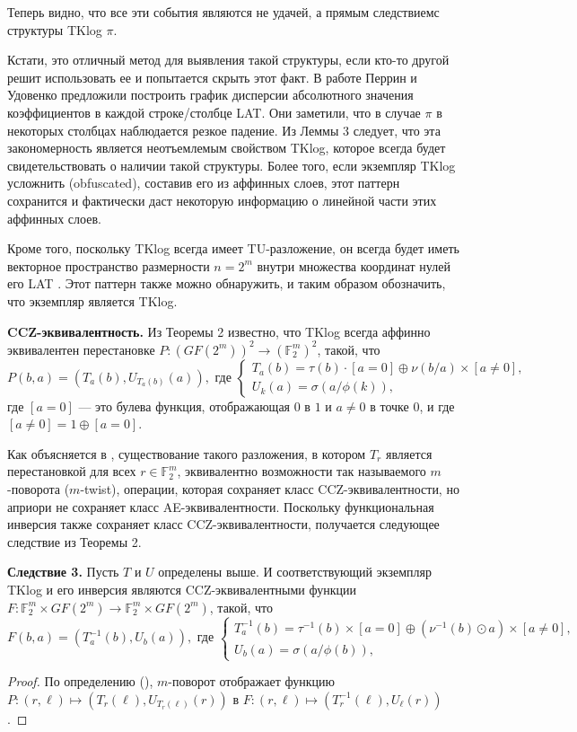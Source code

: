 Теперь видно, что все эти события являются не удачей, а прямым следствиемс структуры TKlog \(\pi\).

Кстати, это отличный метод для выявления такой структуры, если кто-то другой решит использовать ее и попытается скрыть этот факт. В работе \cite{PU16} Перрин и Удовенко предложили построить график дисперсии абсолютного значения коэффициентов в каждой строке/столбце LAT. Они заметили, что в случае \(\pi\) в некоторых столбцах наблюдается резкое падение. Из Леммы 3 следует, что эта закономерность является неотъемлемым свойством TKlog, которое всегда будет свидетельствовать о наличии такой структуры. Более того, если экземпляр TKlog усложнить (obfuscated), составив его из аффинных слоев, этот паттерн сохранится и фактически даст некоторую информацию о линейной части этих аффинных слоев.

Кроме того, поскольку TKlog всегда имеет TU-разложение, он всегда будет иметь векторное пространство размерности \(n = 2^m\)  внутри множества координат нулей его LAT \cite{CP19}. Этот паттерн также можно обнаружить, и таким образом обозначить, что экземпляр является TKlog.

\textbf{CCZ-эквивалентность.} Из Теоремы 2 известно, что TKlog всегда аффинно эквивалентен перестановке \(P : (GF(2^m))^2 \to (\mathbb{F}_2^m)^2\), такой, что
\[
P(b, a) = \left(T_a(b), U_{T_a(b)}(a)\right), \text{ где }\left\{\begin{array}{l}
T_a(b) = \tau(b) \cdot [a = 0] \oplus \nu(b/a) \times [a \neq 0], \\
U_k(a) = \sigma(a/\phi(k)),
\end{array}\right.
\]
где \([a = 0]\) — это булева функция, отображающая \(0\) в \(1\) и \(a \neq 0\) в точке \(0\), и где \([a \neq 0] = 1 \oplus [a = 0]\).

Как объясняется в \cite{CP19}, существование такого разложения, в котором \(T_r\) является перестановкой для всех \(r \in \mathbb{F}_2^m\), эквивалентно возможности так называемого \(m\)-поворота (\(m\)-twist), операции, которая сохраняет класс CCZ-эквивалентности, но априори не сохраняет класс AE-эквивалентности. Поскольку функциональная инверсия также сохраняет класс CCZ-эквивалентности, получается следующее следствие из Теоремы 2.

\textbf{Следствие 3.}
Пусть \(T\) и \(U\) определены выше. И соответствующий экземпляр TKlog и его инверсия являются CCZ-эквивалентными функции \(F : \mathbb{F}_2^m \times GF(2^m) \to \mathbb{F}_2^m \times GF(2^m)\), такой, что
\[
F(b, a) = \left(T_a^{-1}(b), U_b(a)\right), \text{ где }\left
\{\begin{array}{l}
T_a^{-1}(b) = \tau^{-1}(b) \times [a = 0] \oplus \left(\nu^{-1}(b) \odot a\right) \times [a \neq 0], \\
U_b(a) = \sigma(a/\phi(b)),
\end{array}\right.
\]
\begin{proof}
По определению (\cite{CP19}), \(m\)-поворот отображает функцию \(P : (r, \ell) \mapsto \left(T_r(\ell), U_{T_r(\ell)}(r)\right)\) в \(F : (r, \ell) \mapsto \left(T_r^{-1}(\ell), U_{\ell}(r)\right)\).
\end{proof}


